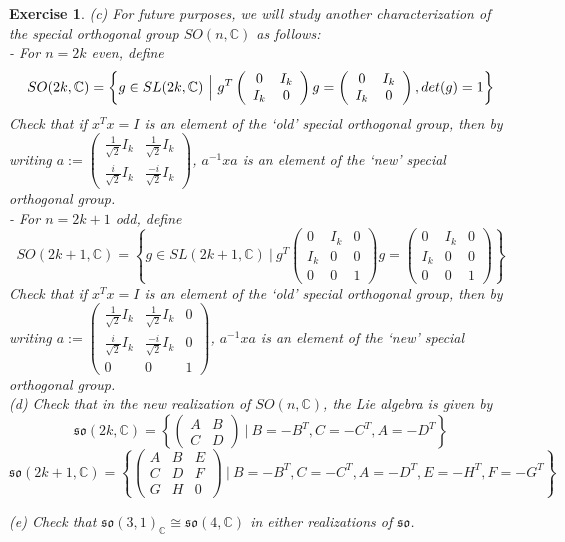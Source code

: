 \documentclass[11pt]{book}
\newtheorem{exercise}[theorem]{Exercise}
\newcommand{\bb}[1]{\mathbb{#1}}
\newcommand{\mf}[1]{\mathfrak{#1}}
\begin{document}
\begin{exercise}
\noindent (c) For future purposes, we will study another characterization of the special orthogonal group $SO(n,\bb{C})$ as follows:\\
- For $n = 2k$ even, define
$$SO(2k,\bb{C}) = \left\{g \in SL(2k,\bb{C})\ \Big|\ g^T \left( \begin{array}{cc}
0 & I_k \\
I_k & 0 \end{array} \right)g = \left( \begin{array}{cc}
0 & I_k \\
I_k & 0 \end{array}\right),\ \\det(g) = 1 \right\}$$
Check that if $x^Tx = I$ is an element of the `old' special orthogonal group, then by writing
$a := \left( \begin{array}{cc}
\frac{1}{\sqrt{2}}I_k & \frac{1}{\sqrt{2}}I_k \\
\frac{i}{\sqrt{2}}I_k & \frac{-i}{\sqrt{2}}I_k \end{array} \right)$, $a^{-1}xa$ is an element of the `new' special orthogonal group.\\
- For $n = 2k+1$ odd, define
$$SO(2k+1,\bb{C}) = \left\{g \in SL(2k+1,\bb{C})\ \Big|\ g^T \left( \begin{array}{ccc}
0 & I_k & 0\\
I_k & 0 & 0 \\
0 & 0 & 1 \end{array} \right)g = \left( \begin{array}{ccc}
0 & I_k & 0\\
I_k & 0 & 0 \\
0 & 0 & 1 \end{array} \right)\right\}$$
Check that if $x^Tx = I$ is an element of the `old' special orthogonal group, then by writing
$a := \left( \begin{array}{ccc}
\frac{1}{\sqrt{2}}I_k & \frac{1}{\sqrt{2}}I_k & 0 \\
\frac{i}{\sqrt{2}}I_k & \frac{-i}{\sqrt{2}}I_k & 0 \\
0 & 0 & 1 \end{array}\right)$, $a^{-1}xa$ is an element of the `new' special orthogonal group.\\

\noindent (d) Check that in the new realization of $SO(n,\bb{C})$, the Lie algebra is given by
$$\mf{so}(2k,\bb{C}) = \left\{ \left( \begin{array}{cc}
A & B \\
C & D \end{array} \right)\ \Big|\ B = -B^T, C = -C^T, A = -D^T \right\}$$
$$\mf{so}(2k+1,\bb{C}) = \left\{ \left( \begin{array}{ccc}
A & B & E\\
C & D & F \\
G & H & 0 \end{array} \right)\ \Big|\ B = -B^T, C = -C^T, A = -D^T, E = -H^T, F = -G^T \right\}$$

\noindent (e) Check that $\mf{so}(3,1)_{\bb{C}} \cong \mf{so}(4,\bb{C})$ in either realizations of $\mf{so}$.
\end{exercise}
\end{document}
